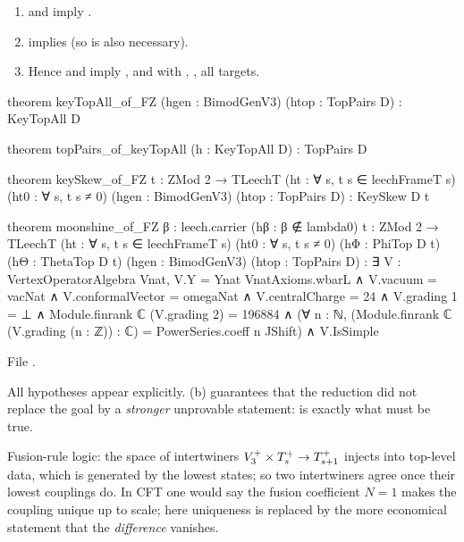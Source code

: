 \begin{theorem}\label{ch14:thm:fzred}
\begin{enumerate}[label=(\alph*)]
\item {} and  imply .
\item {} implies  (so  is also necessary).
\item Hence  and  imply , and with ,
  , all targets.
\end{enumerate}
\end{theorem}
\begin{leancode}
theorem keyTopAll_of_FZ (hgen : BimodGenV3) (htop : TopPairs D) : KeyTopAll D

theorem topPairs_of_keyTopAll (h : KeyTopAll D) : TopPairs D

theorem keySkew_of_FZ {t : ZMod 2 → TLeechT} (ht : ∀ s, t s ∈ leechFrameT s) (ht0 : ∀ s, t s ≠ 0)
    (hgen : BimodGenV3) (htop : TopPairs D) : KeySkew D t

theorem moonshine_of_FZ {β : leech.carrier} (hβ : β ∉ lambda0) {t : ZMod 2 → TLeechT}
    (ht : ∀ s, t s ∈ leechFrameT s) (ht0 : ∀ s, t s ≠ 0)
    (hΦ : PhiTop D t) (hΘ : ThetaTop D t) (hgen : BimodGenV3) (htop : TopPairs D) :
    ∃ V : VertexOperatorAlgebra Vnat,
      V.Y = Ynat VnatAxioms.wbarL ∧ V.vacuum = vacNat ∧ V.conformalVector = omegaNat ∧
      V.centralCharge = 24 ∧
      V.grading 1 = ⊥ ∧
      Module.finrank ℂ (V.grading 2) = 196884 ∧
      (∀ n : ℕ, (Module.finrank ℂ (V.grading (n : ℤ)) : ℂ) = PowerSeries.coeff n JShift) ∧
      V.IsSimple
\end{leancode}
File .

\begin{dictionary}
All hypotheses appear explicitly.  (b) guarantees that the reduction did not replace the goal by a
\emph{stronger} unprovable statement:  is exactly what must be true.
\end{dictionary}

\begin{physics}
Fusion-rule logic: the space of intertwiners $V_3^{+}\times T_s^+\to T_{s+1}^+$ injects into top-level
data, which is generated by the lowest states; so two intertwiners agree once their lowest couplings
do.  In CFT one would say the fusion coefficient $N=1$ makes the coupling unique up to scale; here
uniqueness is replaced by the more economical statement that the \emph{difference} vanishes.
\end{physics}

